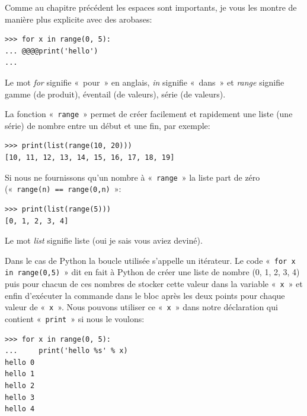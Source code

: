 Comme au chapitre précédent les espaces sont importants, je vous les montre de manière plus explicite avec des arobases:

\begin{Verbatim}[frame=single,rulecolor=\color{gray}, label=ne pas saisir]
>>> for x in range(0, 5):
... @@@@print('hello')
...
\end{Verbatim}

Le mot \emph{for} signifie «~pour~»  en anglais, \emph{in} signifie «~dans~» et \emph{range} signifie gamme (de produit), éventail (de valeurs), série (de valeurs).

La fonction «~\texttt{range}~» permet de créer facilement et rapidement une liste (une série) de nombre entre un début et une fin, par exemple:

\begin{Verbatim}[frame=single,rulecolor=\color{mbleu}, label=à taper]
>>> print(list(range(10, 20)))
[10, 11, 12, 13, 14, 15, 16, 17, 18, 19]
\end{Verbatim}

Si nous ne fournissons qu'un nombre à «~\texttt{range}~» la liste part de zéro («~\texttt{range(n) == range(0,n)}~»:

\begin{Verbatim}[frame=single,rulecolor=\color{mbleu}, label=à taper]
>>> print(list(range(5)))
[0, 1, 2, 3, 4]
\end{Verbatim}

Le mot \emph{list} signifie liste (oui je sais vous aviez deviné).

Dans le cas de Python la boucle utilisée s'appelle un itérateur. Le code «~\texttt{for x in range(0,5)}~» dit en fait à Python de créer une liste de nombre (0, 1, 2, 3, 4) puis pour chacun de ces nombres de stocker cette valeur dans la variable «~\texttt{x}~» et enfin d'exécuter la commande dans le bloc après les deux points pour chaque valeur de «~\texttt{x}~». Nous pouvons utiliser ce «~\texttt{x}~»  dans notre déclaration qui contient «~\texttt{print}~» si nous le voulons:

\begin{Verbatim}[frame=single,rulecolor=\color{green}, label=à taper avec attention]
>>> for x in range(0, 5):
...     print('hello %s' % x)
hello 0
hello 1
hello 2
hello 3
hello 4
\end{Verbatim}

